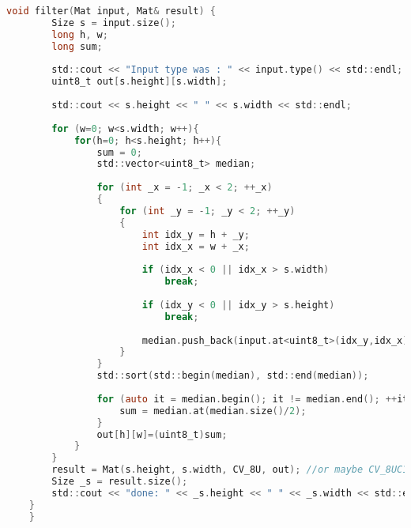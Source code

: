 \begin{lstlisting}[language=C, caption=Noise correction filter, label=lst:noise_filter]
    void filter(Mat input, Mat& result) {
        Size s = input.size();
        long h, w;
        long sum;
        
        std::cout << "Input type was : " << input.type() << std::endl;
        uint8_t out[s.height][s.width];
        
        std::cout << s.height << " " << s.width << std::endl;
        
        for (w=0; w<s.width; w++){
            for(h=0; h<s.height; h++){
                sum = 0;
                std::vector<uint8_t> median;
                
                for (int _x = -1; _x < 2; ++_x)
                {
                    for (int _y = -1; _y < 2; ++_y)
                    {
                        int idx_y = h + _y;
                        int idx_x = w + _x;
                        
                        if (idx_x < 0 || idx_x > s.width)
                            break;
                            
                        if (idx_y < 0 || idx_y > s.height)
                            break;
                        
                        median.push_back(input.at<uint8_t>(idx_y,idx_x));
                    }
                }
                std::sort(std::begin(median), std::end(median));
                        
                for (auto it = median.begin(); it != median.end(); ++it) {
                    sum = median.at(median.size()/2);
                }
                out[h][w]=(uint8_t)sum;
            }
        }
        result = Mat(s.height, s.width, CV_8U, out); //or maybe CV_8UC1?
        Size _s = result.size();
        std::cout << "done: " << _s.height << " " << _s.width << std::endl;
    }
    }
\end{lstlisting}
